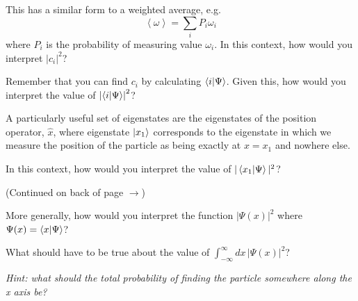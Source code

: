 	\begin{questions}
	
		\question This has a similar form to a weighted average, e.g.
			\begin{equation*}
				\left\langle \omega \right\rangle = \sum_i P_i \omega_i
			\end{equation*}
			where $P_i$ is the probability of measuring value $\omega_i$. 
			In this context, how would you interpret $|c_i|^2$?
			
			\begin{solution}[1in]
			\end{solution}
			
		\question Remember that you can find $c_i$ by calculating $\braket{i|\Psi}$. Given this, how would you interpret the value of $\left|\braket{i|\Psi}\right|^2$?
			
			\begin{solution}[1in]
			\end{solution}
		
		\question A particularly useful set of eigenstates are the eigenstates of the position operator, $\hat x$, where eigenstate $\ket{x_1}$ corresponds to the eigenstate in which we measure the position of the particle as being exactly at $x=x_1$ and nowhere else.
		
			In this context, how would you interpret the value of $|\braket{x_1|\Psi}|^2$?
			
			\begin{solution}[1.75in]
			\end{solution}
			\begin{flushright}(Continued on back of page $\rightarrow$)	\end{flushright}
		
		\newpage
		\question More generally, how would you interpret the function $|\Psi(x)|^2$ where $\Psi(x) = \braket{x|\Psi}$?
		
			\begin{solution}[2in]
			\end{solution}
			
		\question What should have to be true about the value of $\int_{-\infty}^{\infty} dx\, |\Psi(x)|^2$?
		
			\emph{Hint: what should the total probability of finding the particle \emph{somewhere} along the x axis be?}
		
			\begin{solution}
			\end{solution}
		
	\end{questions}
	
